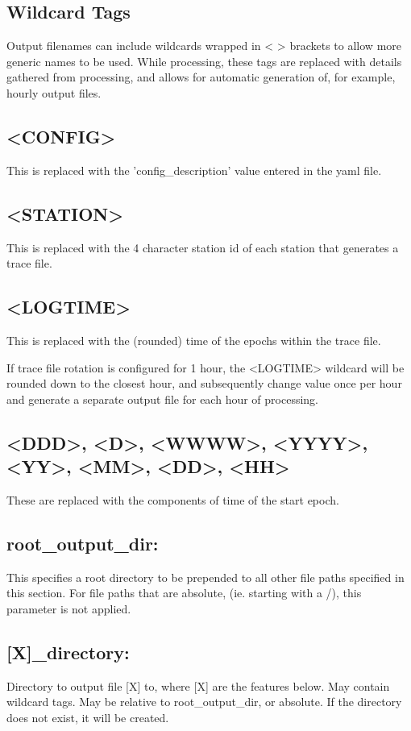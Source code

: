 \subsection{Wildcard Tags}
Output filenames can include wildcards wrapped in < > brackets to allow more generic names to be used. While processing, these tags are replaced with details gathered from processing, and allows for automatic generation of, for example, hourly output files.

\subsection{<CONFIG>}
This is replaced with the 'config\_description' value entered in the yaml file.
\subsection{<STATION>}
This is replaced with the 4 character station id of each station that generates a trace file.
\subsection{<LOGTIME>}
This is replaced with the (rounded) time of the epochs within the trace file.

If trace file rotation is configured for 1 hour, the <LOGTIME> wildcard will be rounded down to the closest hour, and subsequently change value once per hour and generate a separate output file for each hour of processing.

\subsection{<DDD>, <D>, <WWWW>, <YYYY>, <YY>, <MM>, <DD>, <HH>}
These are replaced with the components of time of the start epoch.


\subsection{root\_output\_dir:}
This specifies a root directory to be prepended to all other file paths specified in this section. For file paths that are absolute, (ie. starting with a /), this parameter is not applied.

\subsection{[X]\_directory:}
Directory to output file [X] to, where [X] are the features below. May contain wildcard tags. May be relative to root\_output\_dir, or absolute. If the directory does not exist, it will be created.

